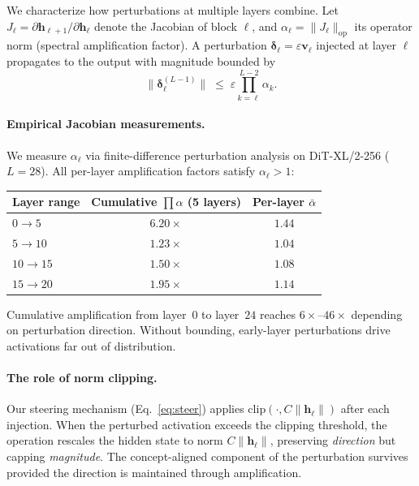 \documentclass{article}
\theoremstyle{definition}
\newcommand{\bv}{\mathbf{v}}
\newcommand{\bh}{\mathbf{h}}
\begin{document}
We characterize how perturbations at multiple layers combine.
Let $J_\ell = \partial \bh_{\ell+1} / \partial \bh_\ell$ denote the Jacobian of block $\ell$, and $\alpha_\ell = \|J_\ell\|_{\mathrm{op}}$ its operator norm (spectral amplification factor).
A perturbation $\boldsymbol{\delta}_\ell = \varepsilon\bv_\ell$ injected at layer $\ell$ propagates to the output with magnitude bounded by
\begin{equation}
  \bigl\|\boldsymbol{\delta}_\ell^{(L-1)}\bigr\| \;\leq\; \varepsilon \prod_{k=\ell}^{L-2} \alpha_k.
  \label{eq:amplification}
\end{equation}

\paragraph{Empirical Jacobian measurements.}
We measure $\alpha_\ell$ via finite-difference perturbation analysis on DiT-XL/2-256 ($L = 28$).
All per-layer amplification factors satisfy $\alpha_\ell > 1$:

\vspace{-0.5em}
\begin{center}
\small
\begin{tabular}{lcc}
\toprule
Layer range & Cumulative $\prod \alpha$ (5 layers) & Per-layer $\bar{\alpha}$ \\
\midrule
$0 \to 5$ & $6.20\times$ & $1.44$ \\
$5 \to 10$ & $1.23\times$ & $1.04$ \\
$10 \to 15$ & $1.50\times$ & $1.08$ \\
$15 \to 20$ & $1.95\times$ & $1.14$ \\
\bottomrule
\end{tabular}
\end{center}
\vspace{-0.5em}

Cumulative amplification from layer~$0$ to layer~$24$ reaches $6\times$--$46\times$ depending on perturbation direction.
Without bounding, early-layer perturbations drive activations far out of distribution.

\paragraph{The role of norm clipping.}
Our steering mechanism (Eq.~\ref{eq:steer}) applies $\mathrm{clip}(\cdot, C\|\bh_\ell\|)$ after each injection.
When the perturbed activation exceeds the clipping threshold, the operation rescales the hidden state to norm $C\|\bh_\ell\|$, preserving \emph{direction} but capping \emph{magnitude}.
The concept-aligned component of the perturbation survives provided the direction is maintained through amplification.
\end{document}
